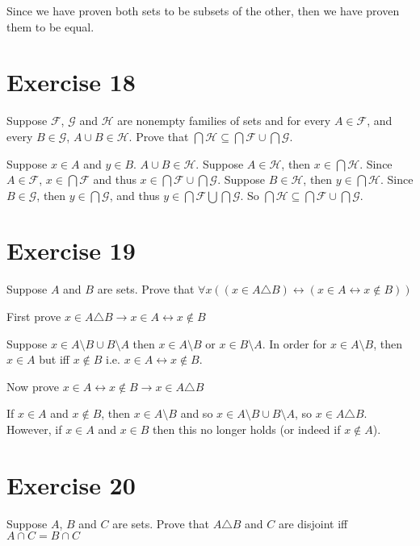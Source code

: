 \documentclass[11pt]{article}
\newcommand{\then}{\rightarrow}
\newcommand{\bicond}{\leftrightarrow}
\newcommand{\family}[1]{\mathcal{#1}}
\begin{document}
Since we have proven both sets to be subsets of the other, then we have proven 
them to be equal.

\section*{Exercise 18}

Suppose $\family{F}$, $\family{G}$ and $\family{H}$ are nonempty families of 
sets and for every $A \in \family{F}$, and every $B \in \family{G}$, $A \cup B \in \family{H}$.
Prove that $\bigcap \family{H} \subseteq \bigcap \family{F} \cup \bigcap \family{G}$.

Suppose $x \in A$ and $y \in B$. $A \cup B \in \family{H}$. Suppose $A \in \family{H}$,
then $x \in \bigcap \family{H}$. Since $A \in \family{F}$, $x \in \bigcap \family{F}$
and thus $x \in \bigcap \family{F} \cup \bigcap \family{G}$. 
Suppose $B \in \family{H}$, then $y \in \bigcap \family{H}$. Since 
$B \in \family{G}$, then $y \in \bigcap \family{G}$, and thus 
$y \in \bigcap \family{F} \bigcup \bigcap \family{G}$. So 
$\bigcap \family{H} \subseteq \bigcap \family{F} \cup \bigcap \family{G}$.

\section*{Exercise 19}

Suppose $A$ and $B$ are sets. Prove that 
$\forall x ((x \in A \triangle B) \bicond (x \in A \bicond x \notin B))$

First prove $x \in A \triangle B \then x \in A \bicond x \notin B$

Suppose $x \in A \setminus B \cup B \setminus A$ then $x \in A \setminus B$ or 
$x \in B \setminus A$. In order for $x \in A \setminus B$, then $x \in A$ but 
iff $x \notin B$ i.e. $x \in A \bicond x \notin B$.

Now prove $x \in A \bicond x \notin B \then x \in A \triangle B$

If $x \in A$ and $x \notin B$, then $x \in A \setminus B$ and so 
$x \in A \setminus B \cup B \setminus A$, so $x \in A \triangle B$. However,
if $x \in A$ and $x \in B$ then this no longer holds (or indeed if $x \notin A$).

\section*{Exercise 20}

Suppose $A$, $B$ and $C$ are sets. Prove that $A \triangle B$ and $C$ are 
disjoint iff $A \cap C = B \cap C$
\end{document}
